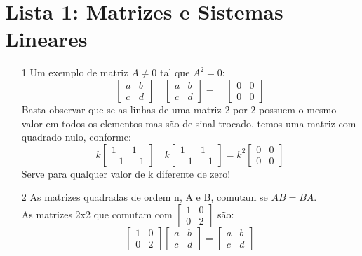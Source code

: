 \documentclass[a4paper]{article}
\begin{document}
\section*{Lista 1: Matrizes e Sistemas Lineares}

\begin{itemize}
\item[1] Um exemplo de matriz $A \neq 0$ tal que $A^2=0$:
$$
\left[\begin{array}{rr}
a&b\\
c&d
\end{array}\right]
\quad
\left[\begin{array}{cc}
a&b\\
c&d
\end{array}\right]
=
\quad
\left[\begin{array}{cc}
0&0\\
0&0
\end{array}\right]
$$
\textcolor[rgb]{0,0,1}{Basta observar que se as linhas de uma matriz 2 por 2 possuem o mesmo valor em todos os elementos mas são de sinal trocado, temos uma matriz com quadrado nulo, conforme:
$$
k\left[\begin{array}{rr}
1&1\\
-1&-1
\end{array}\right]
\quad
k\left[\begin{array}{rr}
1&1\\
-1&-1
\end{array}\right]
=
k^2
\left[\begin{array}{cc}
0&0\\
0&0
\end{array}\right]
$$
Serve para qualquer valor de k diferente de zero!
}
\item[2] As matrizes quadradas de ordem n, A e B, comutam se $AB = BA$. 
\\\textcolor[rgb]{0,0,1}{As matrizes 2x2 que comutam com $\left[\begin{array}{cc}
1&0\\0&2
\end{array}\right]$ são:
$$
\begin{bmatrix}
1&0\\0&2
\end{bmatrix}
\begin{bmatrix}
a&b\\c&d
\end{bmatrix}
=
\begin{bmatrix}
a&b\\c&d
\end{bmatrix}
$$}
\end{itemize}
\end{document}
